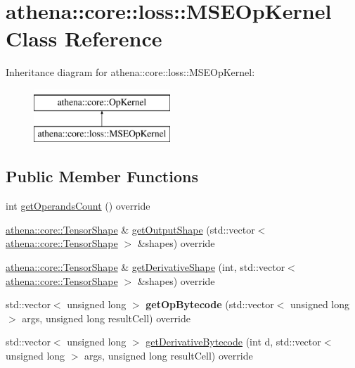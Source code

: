 \hypertarget{classathena_1_1core_1_1loss_1_1_m_s_e_op_kernel}{}\section{athena\+:\+:core\+:\+:loss\+:\+:M\+S\+E\+Op\+Kernel Class Reference}
\label{classathena_1_1core_1_1loss_1_1_m_s_e_op_kernel}
Inheritance diagram for athena\+:\+:core\+:\+:loss\+:\+:M\+S\+E\+Op\+Kernel\+:\begin{figure}[H]
\begin{center}
\leavevmode
\includegraphics[height=2.000000cm]{classathena_1_1core_1_1loss_1_1_m_s_e_op_kernel}
\end{center}
\end{figure}
\subsection*{Public Member Functions}
\begin{DoxyCompactItemize}
\item 
int \mbox{\hyperlink{classathena_1_1core_1_1loss_1_1_m_s_e_op_kernel_ab851ee62ea95c3aab8aab2d28cfa9d04}{get\+Operands\+Count}} () override
\item 
\mbox{\hyperlink{classathena_1_1core_1_1_tensor_shape}{athena\+::core\+::\+Tensor\+Shape}} \& \mbox{\hyperlink{classathena_1_1core_1_1loss_1_1_m_s_e_op_kernel_a23aacffbbc73b177535511702f3c441d}{get\+Output\+Shape}} (std\+::vector$<$ \mbox{\hyperlink{classathena_1_1core_1_1_tensor_shape}{athena\+::core\+::\+Tensor\+Shape}} $>$ \&shapes) override
\item 
\mbox{\hyperlink{classathena_1_1core_1_1_tensor_shape}{athena\+::core\+::\+Tensor\+Shape}} \& \mbox{\hyperlink{classathena_1_1core_1_1loss_1_1_m_s_e_op_kernel_a68a0220e3a3591638c7725b5cb659609}{get\+Derivative\+Shape}} (int, std\+::vector$<$ \mbox{\hyperlink{classathena_1_1core_1_1_tensor_shape}{athena\+::core\+::\+Tensor\+Shape}} $>$ \&shapes) override
\item 
\mbox{\label{classathena_1_1core_1_1loss_1_1_m_s_e_op_kernel_a86e6436fad7cad62c235dcde0f3991ce}} 
std\+::vector$<$ unsigned long $>$ {\bfseries get\+Op\+Bytecode} (std\+::vector$<$ unsigned long $>$ args, unsigned long result\+Cell) override
\item 
std\+::vector$<$ unsigned long $>$ \mbox{\hyperlink{classathena_1_1core_1_1loss_1_1_m_s_e_op_kernel_a2d1fc6b2900abc3ebd0466c8de3e68e2}{get\+Derivative\+Bytecode}} (int d, std\+::vector$<$ unsigned long $>$ args, unsigned long result\+Cell) override
\end{DoxyCompactItemize}
